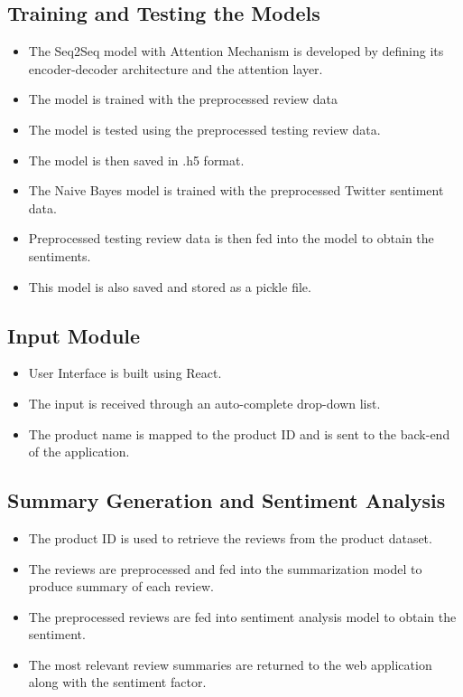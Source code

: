 \documentclass[11pt]{report}
\begin{document}
\subsection{Training and Testing the Models}
\begin{itemize}
    \item The Seq2Seq model with Attention Mechanism is developed by defining its encoder-decoder architecture and the attention layer.
    \item The model is trained with the preprocessed review data
    \item The model is tested using the preprocessed testing review data.
    \item The model is then saved in .h5 format.
    \item The Naive Bayes model is trained with the preprocessed Twitter sentiment data.
    \item Preprocessed testing review data is then fed into the model to obtain the sentiments.
    \item This model is also saved and stored as a pickle file.
\end{itemize}

\subsection{Input Module}
\begin{itemize}
\item User Interface is built using React.
\item The input is received through an auto-complete drop-down list.
\item The product name is mapped to the product ID and is sent to the back-end of the application.
\end{itemize}

\subsection{Summary Generation and Sentiment Analysis}
\begin{itemize}
\item The product ID is used to retrieve the reviews from the product dataset.
\item The reviews are preprocessed and fed into the summarization model to produce summary of each review.
\item The preprocessed reviews are fed into sentiment analysis model to obtain the sentiment.
\item The most relevant review summaries are returned to the web application along with the sentiment factor.
\end{itemize}
\end{document}

